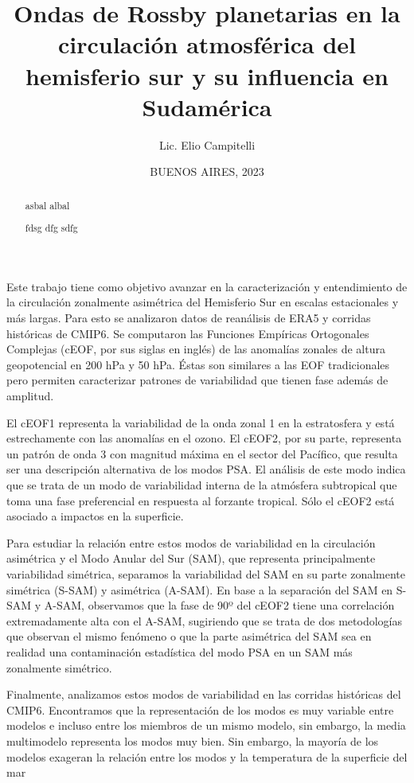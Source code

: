 \documentclass[12pt,oneside]{reedthesis}
\title{Ondas de Rossby planetarias en la circulación atmosférica del hemisferio sur y su influencia en Sudamérica}
\author{Lic. Elio Campitelli}
\date{BUENOS AIRES, 2023}
\begin{document}
  \maketitle

\frontmatter %
\pagestyle{empty} %

  \begin{resumen}
    Este trabajo tiene como objetivo avanzar en la caracterización y entendimiento de la circulación zonalmente asimétrica del Hemisferio Sur en escalas estacionales y más largas.
    Para esto se analizaron datos de reanálisis de ERA5 y corridas históricas de CMIP6.
    Se computaron las Funciones Empíricas Ortogonales Complejas (cEOF, por sus siglas en inglés) de las anomalías zonales de altura geopotencial en 200 hPa y 50 hPa.
    Éstas son similares a las EOF tradicionales pero permiten caracterizar patrones de variabilidad que tienen fase además de amplitud.

    El cEOF1 representa la variabilidad de la onda zonal 1 en la estratosfera y está estrechamente con las anomalías en el ozono.
    El cEOF2, por su parte, representa un patrón de onda 3 con magnitud máxima en el sector del Pacífico, que resulta ser una descripción alternativa de los modos PSA.
    El análisis de este modo indica que se trata de un modo de variabilidad interna de la atmósfera subtropical que toma una fase preferencial en respuesta al forzante tropical.
    Sólo el cEOF2 está asociado a impactos en la superficie.

    Para estudiar la relación entre estos modos de variabilidad en la circulación asimétrica y el Modo Anular del Sur (SAM), que representa principalmente variabilidad simétrica, separamos la variabilidad del SAM en su parte zonalmente simétrica (S-SAM) y asimétrica (A-SAM).
    En base a la separación del SAM en S-SAM y A-SAM, observamos que la fase de 90º del cEOF2 tiene una correlación extremadamente alta con el A-SAM, sugiriendo que se trata de dos metodologías que observan el mismo fenómeno o que la parte asimétrica del SAM sea en realidad una contaminación estadística del modo PSA en un SAM más zonalmente simétrico.

    Finalmente, analizamos estos modos de variabilidad en las corridas históricas del CMIP6.
    Encontramos que la representación de los modos es muy variable entre modelos e incluso entre los miembros de un mismo modelo, sin embargo, la media multimodelo representa los modos muy bien.
    Sin embargo, la mayoría de los modelos exageran la relación entre los modos y la temperatura de la superficie del mar
  \end{resumen}
  \begin{abstract}
    asbal albal

    fdsg dfg sdfg
  \end{abstract}
\end{document}
